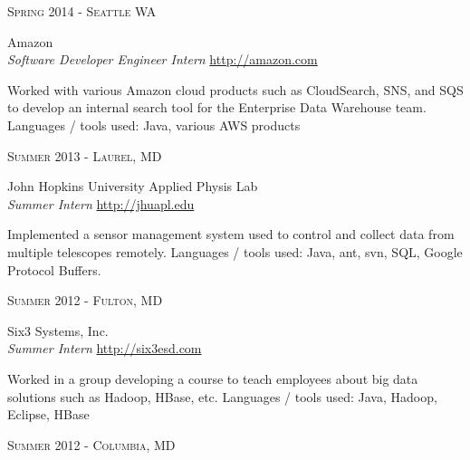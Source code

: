 \documentclass[10pt]{article} %
\begin{document}
{\begin{minipage}[t]{0.5\textwidth}
{\raggedleft\textsc{Spring 2014 - Seattle WA}\par}

{\raggedright\large Amazon \\
\textit{Software Developer Engineer Intern}  \hfill {\small \href{http://amazon.com}{http://amazon.com}}\\ [5pt]}

\normalsize{Worked with various Amazon cloud products such as CloudSearch, SNS, 
and SQS to develop an internal search tool for the Enterprise Data Warehouse 
team. Languages / tools used: Java, various AWS products}\\


{\raggedleft\textsc{Summer 2013 - Laurel, MD}\par}

{\raggedright\large John Hopkins University Applied Physis Lab \\
\textit{Summer Intern}  \hfill {\small \href{http://jhuapl.edu}{http://jhuapl.edu}}\\ [5pt]}

\normalsize{Implemented a sensor management system used to control and collect data from multiple telescopes remotely. Languages / tools used: Java, ant, svn, SQL, Google Protocol Buffers.}\\


{\raggedleft\textsc{Summer 2012 - Fulton, MD}\par}

{\raggedright\large Six3 Systems, Inc. \\
\textit{Summer Intern} \hfill {\small \href{http://six3esd.com}{http://six3esd.com}} \\[5pt]}

\normalsize{Worked in a group developing a course to teach employees about big data solutions such as Hadoop, HBase, etc. Languages / tools used: Java, Hadoop, Eclipse, HBase}\\


{\raggedleft\textsc{Summer 2012 - Columbia, MD}\par}


\end{minipage}}
\end{document}
